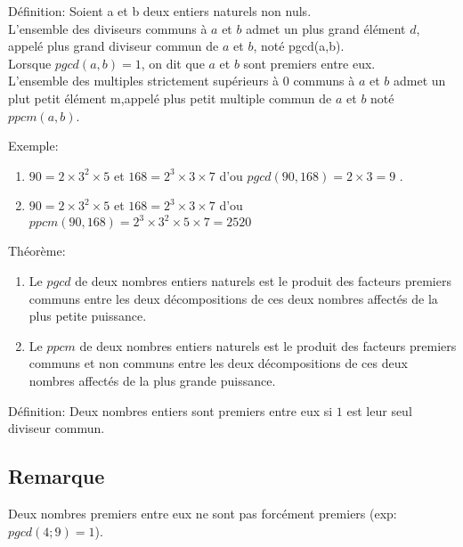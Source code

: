 \documentclass[12pt,a4paper]{book}
\begin{document}
\begin{tcolorbox}[colback=col3,colframe=col4,leftrule=5pt,toprule=0pt,rightrule=0pt,bottomrule=0pt,arc=0pt,outer arc=0pt,top=12pt]


\large Définition:
Soient a et b deux entiers naturels non nuls. \\
L'ensemble des diviseurs communs à $a$ et $b$ admet un plus grand élément $d$, appelé plus grand diviseur commun de $a$ et $b$, noté pgcd(a,b).\\
Lorsque $pgcd(a,b)=1$, on dit que $a$ et $b$ sont premiers entre eux.\\
L'ensemble des multiples strictement supérieurs à $0$ communs à $a$ et $b$ admet un plut petit élément m,appelé plus petit multiple commun de $a$ et $b$ noté $ppcm(a,b)$.
\end{tcolorbox} 
\begin{tcolorbox}[colback=col6,colframe=col1,leftrule=5pt,toprule=0pt,rightrule=0pt,bottomrule=0pt,arc=0pt,outer arc=0pt,top=12pt]
 
\large Exemple: 
\begin{enumerate}[label=\textbullet]
\item$90= 2 \times 3^2 \times 5$ et $168= 2^3 \times 3 \times 7$  d'ou $pgcd(90,168)=2 \times 3=9$ .
\item $90= 2 \times 3^2 \times 5$ et $168= 2^3 \times 3 \times 7$  d'ou $ppcm(90,168)=2^3 \times 3^2 \times 5 \times 7 = 2520$
\end{enumerate}
\end{tcolorbox}
\begin{tcolorbox}[colback=col6,colframe=col2,leftrule=5pt,toprule=0pt,rightrule=0pt,bottomrule=0pt,arc=0pt,outer arc=0pt,top=12pt]


\large Théorème:
\begin{enumerate}[label=\textbullet]
\item Le $pgcd$ de deux nombres entiers naturels est le produit des facteurs premiers communs entre les deux décompositions de ces deux nombres affectés de la plus petite puissance.
\item Le $ppcm$ de deux nombres entiers naturels est le produit des facteurs premiers communs et non communs entre les deux décompositions de ces deux nombres affectés de la plus grande puissance.
\end{enumerate}
\end{tcolorbox}
\begin{tcolorbox}[colback=col3,colframe=col4,leftrule=5pt,toprule=0pt,rightrule=0pt,bottomrule=0pt,arc=0pt,outer arc=0pt,top=12pt]


\large Définition:
Deux nombres entiers sont premiers entre eux si $1$ est leur seul diviseur commun.
\end{tcolorbox} 
\subsection{Remarque} 
Deux nombres premiers entre eux ne sont pas forcément premiers (exp:$pgcd(4;9)=1$).
\end{document}
